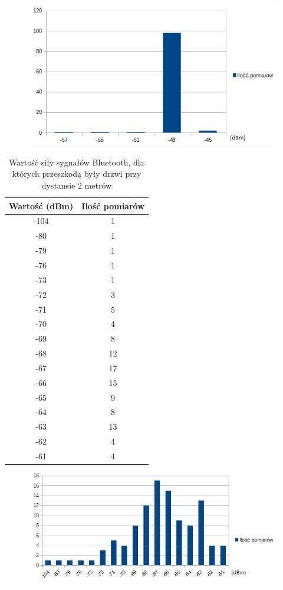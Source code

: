 \begin{figure}[H]			
\centering
\includegraphics[width=1.0\textwidth]{wykres_wifi_3}
\end{figure}
\begin{table}[H]
	\caption {Wartość siły sygnałów Bluetooth, dla których przeszkodą były drzwi przy dystansie 2 metrów}
\begin{center}
		\begin{tabular}{|c|c|}
			\hline
			Wartość (dBm) & Ilość pomiarów \\ 
			\hline
			-104 & 1\\
			\hline
			-80 & 1\\
			\hline
			-79 & 1\\
			\hline
			-76 & 1\\
			\hline
			-73 & 1\\
			\hline
			-72 & 3\\
			\hline
			-71 & 5\\
			\hline
			-70 & 4\\
			\hline
			-69 & 8\\
			\hline
			-68 & 12\\
			\hline
			-67 & 17\\
			\hline
			-66 & 15\\
			\hline
			-65 & 9\\
			\hline
			-64 & 8\\
			\hline
			-63 & 13\\
			\hline
			-62 & 4\\
			\hline
			-61 & 4\\
			\hline
		\end{tabular}
\end{center}
\end{table}
\begin{figure}[H]			
\centering
\includegraphics[width=1.0\textwidth]{wykres_bluetooth_3}
\end{figure}
